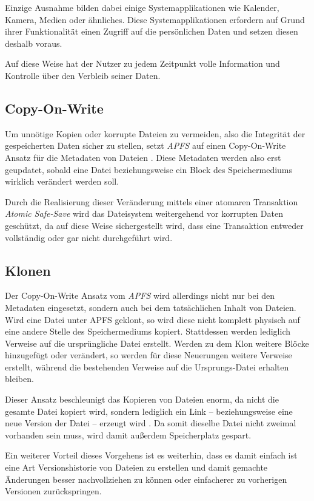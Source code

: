 Einzige Ausnahme bilden dabei einige Systemapplikationen wie Kalender, Kamera,
Medien oder ähnliches. Diese Systemapplikationen erfordern auf Grund ihrer
Funktionalität einen Zugriff auf die persönlichen Daten und setzen diesen
deshalb voraus.

Auf diese Weise hat der Nutzer zu jedem Zeitpunkt volle Information und
Kontrolle über den Verbleib seiner Daten.

\subsection{Copy-On-Write}
Um unnötige Kopien oder korrupte Dateien zu vermeiden, also die Integrität der
gespeicherten Daten sicher zu stellen, setzt \textit{APFS} auf einen
Copy-On-Write Ansatz für die Metadaten von Dateien \cite{golem}. Diese Metadaten
werden also erst geupdatet, sobald eine Datei beziehungsweise ein Block des
Speichermediums wirklich verändert werden soll.

Durch die Realisierung dieser Veränderung mittels einer atomaren Transaktion
\textit{Atomic Safe-Save} wird das Dateisystem weitergehend vor korrupten Daten
geschützt, da auf diese Weise sichergestellt wird, dass eine Transaktion
entweder vollständig oder gar nicht durchgeführt wird.


\subsection{Klonen}
Der Copy-On-Write Ansatz vom \textit{APFS} wird allerdings nicht nur bei den
Metadaten eingesetzt, sondern auch bei dem tatsächlichen Inhalt von Dateien.
Wird eine Datei unter APFS geklont, so wird diese nicht komplett physisch auf
eine andere Stelle des Speichermediums kopiert. Stattdessen werden lediglich
Verweise auf die ursprüngliche Datei erstellt. Werden zu dem Klon weitere Blöcke
hinzugefügt oder verändert, so werden für diese Neuerungen weitere Verweise
erstellt, während die bestehenden Verweise auf die Ursprungs-Datei erhalten bleiben.

Dieser Ansatz beschleunigt das Kopieren von Dateien enorm, da nicht die gesamte
Datei kopiert wird, sondern lediglich ein Link -- beziehungsweise eine neue
Version der Datei -- erzeugt wird \cite{about_apfs}. Da somit dieselbe Datei nicht
zweimal vorhanden sein muss, wird damit außerdem Speicherplatz gespart.

Ein weiterer Vorteil dieses Vorgehens ist es weiterhin, dass es damit einfach
ist eine Art Versionshistorie von Dateien zu erstellen und damit gemachte
Änderungen besser nachvollziehen zu können oder einfacherer zu vorherigen
Versionen zurückspringen.


